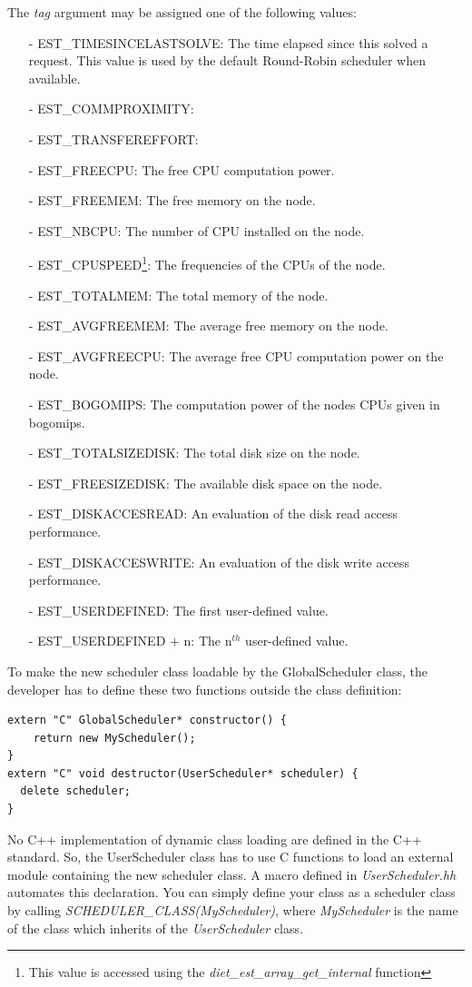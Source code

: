 \noindent The \textit{tag} argument may be assigned one of the following values:
\begin{itemize}
  \item[-] EST\_TIMESINCELASTSOLVE: The time elapsed since this {\sed} solved
    a request. This value is used by the default Round-Robin scheduler when
    available.
  \item[-] EST\_COMMPROXIMITY:
  \item[-] EST\_TRANSFEREFFORT:
  \item[-] EST\_FREECPU: The free CPU computation power.
  \item[-] EST\_FREEMEM: The free memory on the node.
  \item[-] EST\_NBCPU: The number of CPU installed on the node.
  \item[-] EST\_CPUSPEED\footnote{This value is accessed using the
      \textit{diet\_est\_array\_get\_internal} function}: The frequencies
    of the CPUs of the node.
  \item[-] EST\_TOTALMEM: The total memory of the node.
  \item[-] EST\_AVGFREEMEM: The average free memory on the node.
  \item[-] EST\_AVGFREECPU: The average free CPU computation power on the node.
  \item[-] EST\_BOGOMIPS\footnotemark[\value{footnote}]: The computation power
    of the nodes CPUs given in bogomips.
  \item[-] EST\_TOTALSIZEDISK: The total disk size on the node.
  \item[-] EST\_FREESIZEDISK: The available disk space on the node.
  \item[-] EST\_DISKACCESREAD: An evaluation of the disk read access performance.
  \item[-] EST\_DISKACCESWRITE: An evaluation of the disk write access performance.
  \item[-] EST\_USERDEFINED: The first user-defined value.
  \item[-] EST\_USERDEFINED $+$ n: The n$^{th}$ user-defined value.
\end{itemize}

To make the new scheduler class loadable by the GlobalScheduler class, the
developer has to define these two functions outside the class definition:
\begin{verbatim}
extern "C" GlobalScheduler* constructor() {
    return new MyScheduler();
}
extern "C" void destructor(UserScheduler* scheduler) {
  delete scheduler;
}
\end{verbatim}
No C++ implementation of dynamic class loading are defined in the C++ standard.
So, the UserScheduler class has to use C functions to load an external module
containing the new scheduler class. A macro defined in \textit{UserScheduler.hh}
automates this declaration. You can simply define your class as a scheduler
class by calling \textit{SCHEDULER\_CLASS(MyScheduler)}, where
\textit{MyScheduler} is the name of the class which inherits of
the \textit{UserScheduler} class.


